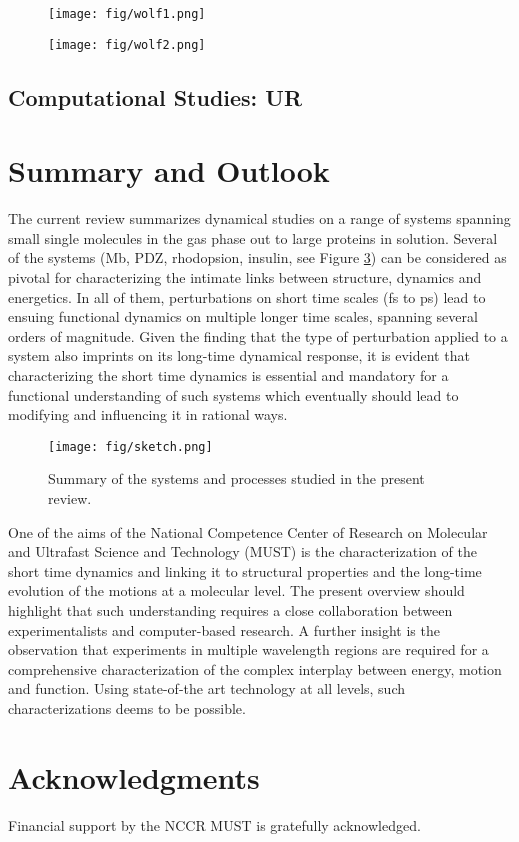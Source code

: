 \documentclass[journal=jacsat,manuscript=article]{achemso}
\begin{document}
\begin{figure}
\texttt{[image: fig/wolf1.png]}
\caption{        }
\label{fig:wolf1}
\end{figure}


\begin{figure}
\texttt{[image: fig/wolf2.png]}
\caption{        }
\label{fig:wolf2}
\end{figure} 

\subsection{Computational Studies: UR}




\section{Summary and Outlook}
The current review summarizes dynamical studies on a range of systems
spanning small single molecules in the gas phase out to large proteins
in solution. Several of the systems (Mb, PDZ, rhodopsion, insulin, see
Figure \ref{fig:sketch}) can be considered as pivotal for
characterizing the intimate links between structure, dynamics and
energetics. In all of them, perturbations on short time scales (fs to
ps) lead to ensuing functional dynamics on multiple longer time
scales, spanning several orders of magnitude. Given the finding that
the type of perturbation applied to a system also imprints on its
long-time dynamical response, it is evident that characterizing the
short time dynamics is essential and mandatory for a functional
understanding of such systems which eventually should lead to
modifying and influencing it in rational ways.

\begin{figure}
\texttt{[image: fig/sketch.png]}
\caption{Summary of the systems and processes studied in the present
  review.}
\label{fig:sketch}
\end{figure} 
    
One of the aims of the National Competence Center of Research on
Molecular and Ultrafast Science and Technology (MUST) is the
characterization of the short time dynamics and linking it to
structural properties and the long-time evolution of the motions at a
molecular level. The present overview should highlight that such
understanding requires a close collaboration between experimentalists
and computer-based research. A further insight is the observation that
experiments in multiple wavelength regions are required for a
comprehensive characterization of the complex interplay between
energy, motion and function. Using state-of-the art technology at all
levels, such characterizations deems to be possible.

\section*{Acknowledgments}
Financial support by the NCCR MUST is gratefully acknowledged.



\end{document}
